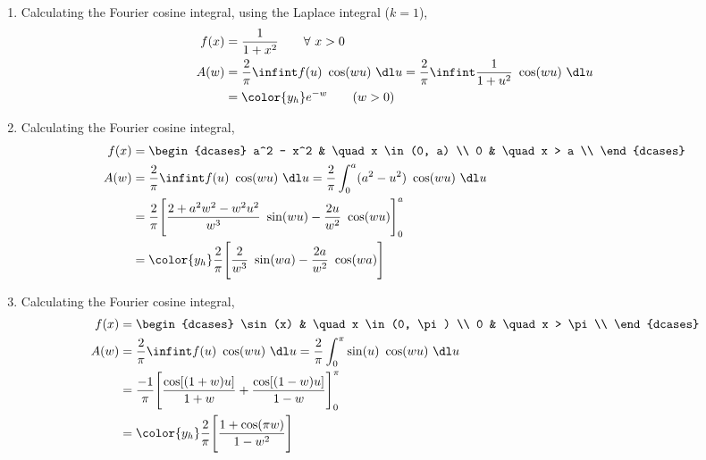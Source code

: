 \begin{enumerate}
    \item Calculating the Fourier cosine integral, using the Laplace integral
          ($ k = 1 $),
          \begin{align}
              f(x) & = \frac{1}{1 + x^2} \qquad \forall\ x > 0           \\
              A(w) & = \frac{2}{\pi} \infint f(u)\ \cos(wu)\ \dl u
              = \frac{2}{\pi} \infint \frac{1}{1 + u^2}\ \cos(wu)\ \dl u \\
                   & = \color{y_h} e^{-w} \qquad (w>0)
          \end{align}

    \item Calculating the Fourier cosine integral,
          \begin{align}
              f(x) & = \begin{dcases}
                           a^2 - x^2 & \quad x \in (0, a) \\
                           0         & \quad x > a        \\
                       \end{dcases}                          \\
              A(w) & = \frac{2}{\pi} \infint f(u)\ \cos(wu)\ \dl u
              = \frac{2}{\pi} \int_{0}^{a} (a^2 - u^2)\ \cos(wu)\ \dl u        \\
                   & = \frac{2}{\pi}\Bigg[\frac{2 + a^2w^2 - w^2u^2}{w^3}
                  \ \sin(wu)
              - \frac{2u}{w^2}\ \cos(wu)  \Bigg]_0^a                           \\
                   & = \color{y_h} \frac{2}{\pi}\Bigg[ \frac{2}{w^3}\ \sin(wa)
                  - \frac{2a}{w^2}\ \cos(wa)  \Bigg]
          \end{align}

    \item Calculating the Fourier cosine integral,
          \begin{align}
              f(x) & = \begin{dcases}
                           \sin(x) & \quad x \in (0, \pi) \\
                           0       & \quad x > \pi        \\
                       \end{dcases}                 \\
              A(w) & = \frac{2}{\pi} \infint f(u)\ \cos(wu)\ \dl u
              = \frac{2}{\pi} \int_{0}^{\pi} \sin(u)\ \cos(wu)\ \dl u \\
                   & = \frac{-1}{\pi}\Bigg[\frac{\cos[(1+w)u]}{1+w}
              + \frac{\cos[(1-w)u]}{1-w}\Bigg]_0^\pi                  \\
                   & =  \color{y_h}
              \frac{2}{\pi} \Bigg[ \frac{1 + \cos(\pi w)}{1 - w^2} \Bigg]
          \end{align}


\end{enumerate}
